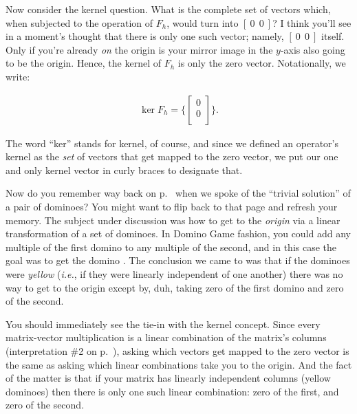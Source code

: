 Now consider the kernel question. What is the complete set of vectors which,
when subjected to the operation of $F_{h}$, would turn into $[\ 0\ \ 0\ ]$? I
think you'll see in a moment's thought that there is only one such vector;
namely, $[\ 0\ \ 0\ ]$ itself. Only if you're already \textit{on} the origin is
your mirror image in the $y$-axis also going to be the origin. Hence, the
kernel of $F_{h}$ is only the zero vector. Notationally, we write:

\vspace{-.15in}
\begin{align*}
\ker F_{h} = \{ 
\begin{bmatrix}
0 \\ 0 \\
\end{bmatrix}
\}.
\end{align*}
\vspace{-.15in}


The word ``ker'' stands for kernel, of course, and since we defined an
operator's kernel as the \textit{set} of vectors that get mapped to the zero
vector, we put our one and only kernel vector in curly braces to designate
that.

Now do you remember way back on p.~\pageref{trivialSolution} when we spoke of
the ``trivial solution'' of a pair of dominoes? You might want to flip back to
that page and refresh your memory. The subject under discussion was how to get
to the \textit{origin} via a linear transformation of a set of dominoes. In
Domino Game fashion, you could add any multiple of the first domino to any
multiple of the second, and in this case the goal was to get the domino
.
The conclusion we came to was that if the dominoes were \textit{yellow}
(\textit{i.e.}, if they were linearly independent of one another) there was no
way to get to the origin except by, duh, taking zero of the first domino and
zero of the second.

You should immediately see the tie-in with the kernel concept. Since every
matrix-vector multiplication is a linear combination of the matrix's columns
(interpretation \#2 on p.~\pageref{twoInterpretations}), asking which vectors
get mapped to the zero vector is the same as asking which linear combinations
take you to the origin. And the fact of the matter is that if your matrix has
linearly independent columns (yellow dominoes) then there is only one such
linear combination: zero of the first, and zero of the second.

